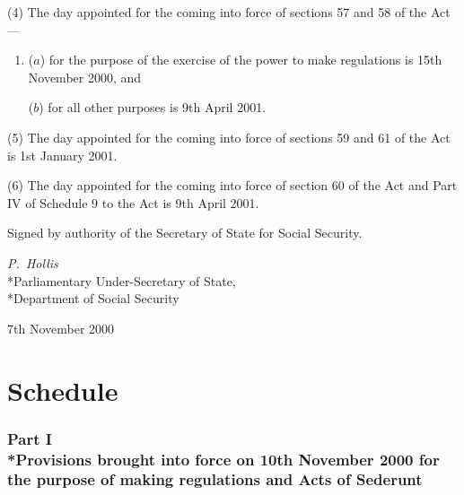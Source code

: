 \documentclass[12pt,a4paper]{article}
\begin{document}
(4) The day appointed for the coming into force of sections 57 and 58 of the Act—
\begin{enumerate}\item[]
($a$) for the purpose of the exercise of the power to make regulations is 15th November 2000, and

($b$) for all other purposes is 9th April 2001.
\end{enumerate}

(5) The day appointed for the coming into force of sections 59 and 61 of the Act is 1st January 2001.

(6) The day appointed for the coming into force of section 60 of the Act and Part IV of Schedule 9 to the Act is 9th April 2001. 

\bigskip

Signed 
by authority of the Secretary of State for Social Security.

{\raggedleft
\emph{P.~Hollis}\\*Parliamentary Under-Secretary of State,\\*Department of Social Security

}

7th November 2000

\small

\part{Schedule}

\section[Part I --- Provisions brought into force on 10th November 2000 for the purpose of making regulations and Acts of Sederunt]{Part I\\*Provisions brought into force on 10th November 2000 for the purpose of making regulations and Acts of Sederunt}

\renewcommand\parthead{--- Schedule Part I}
\end{document}
